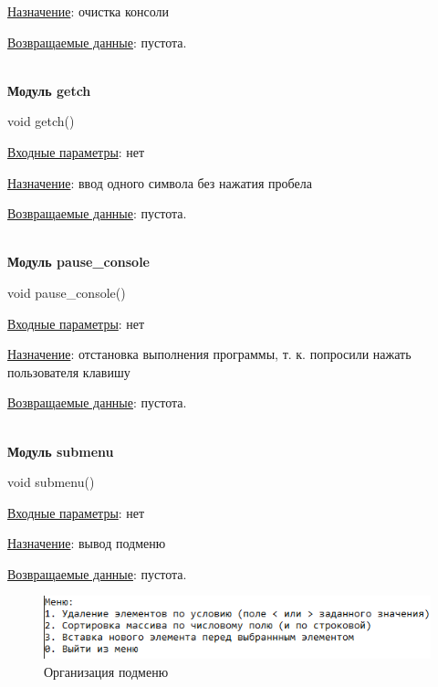\underline{Назначение}: очистка консоли 

\underline{Возвращаемые данные}: пустота.

\hspace{0pt}\\



\textbf{Модуль getch}

void getch()

\underline{Входные параметры}: нет

\underline{Назначение}: ввод одного символа без нажатия пробела 

\underline{Возвращаемые данные}: пустота.

\hspace{0pt}\\



\textbf{Модуль pause\_console}

void pause\_console()

\underline{Входные параметры}: нет

\underline{Назначение}: отстановка выполнения программы, т. к. попросили нажать пользователя клавишу 

\underline{Возвращаемые данные}: пустота.

\hspace{0pt}\\



\textbf{Модуль submenu}

void submenu()

\underline{Входные параметры}: нет

\underline{Назначение}: вывод подменю 

\underline{Возвращаемые данные}: пустота.

\begin{figure}[!hp]
    \begin{center}
        \includegraphics[width=14cm]{../includes_PZ/programmDevelopment/submenu.png}
    \end{center}
    \caption{Организация подменю\label{fig:submenu}}
\end{figure}

\hspace{0pt}\\




